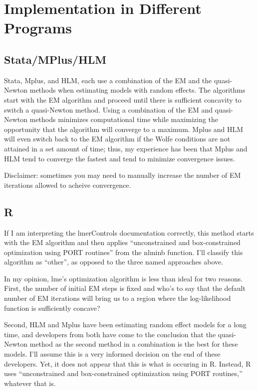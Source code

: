 \documentclass[
  letterpaper,
  DIV=11,
  numbers=noendperiod]{scrreprt}
\begin{document}
\section{Implementation in Different
Programs}\label{implementation-in-different-programs}

\subsection{Stata/MPlus/HLM}\label{statamplushlm}

Stata, Mplus, and HLM, each use a combination of the EM and the
quasi-Newton methods when estimating models with random effects. The
algorithms start with the EM algorithm and proceed until there is
sufficient concavity to switch a quasi-Newton method. Using a
combination of the EM and quasi-Newton methods minimizes computational
time while maximizing the opportunity that the algorithm will converge
to a maximum. Mplus and HLM will even switch back to the EM algorithm if
the Wolfe conditions are not attained in a set amount of time; thus, my
experience has been that Mplus and HLM tend to converge the fastest and
tend to minimize convergence issues.

Disclaimer: sometimes you may need to manually increase the number of EM
iterations allowed to acheive convergence.

\subsection{R}\label{r}

If I am interpreting the lmerControls documentation correctly, this
method starts with the EM algorithm and then applies ``unconstrained and
box-constrained optimization using PORT routines'' from the nlminb
function. I'll classify this algorithm as ``other'', as opposed to the
three named approaches above.

In my opinion, lme's optimization algorithm is less than ideal for two
reasons. First, the number of initial EM steps is fixed and who's to say
that the default number of EM iterations will bring us to a region where
the log-likelihood function is sufficiently concave?

Second, HLM and Mplus have been estimating random effect models for a
long time, and developers from both have come to the conclusion that the
quasi-Newton method as the second method in a combination is the best
for these models. I'll assume this is a very informed decision on the
end of these developers. Yet, it does not appear that this is what is
occuring in R. Instead, R uses ``unconstrained and box-constrained
optimization using PORT routines,'' whatever that is.
\end{document}
